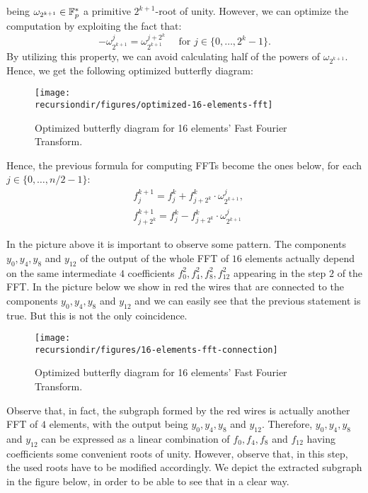 being $\omega_{2^{k+1}} \in \mathbb{F}_p^*$ a primitive $2^{k+1}$-root of unity. However, we can optimize the computation by exploiting the fact that:
\[
- \omega_{2^{k+1}}^j = \omega_{2^{k+1}}^{j + 2^k} \quad \text{ for } j \in \{0, \dots, 2^k - 1\}.
\]
By utilizing this property, we can avoid calculating half of the powers of $\omega_{2^{k+1}}$. Hence, we get the following optimized butterfly diagram:

\begin{figure}[H]
\centering
\texttt{[image: \\recursiondir/figures/optimized-16-elements-fft]}
\caption{Optimized butterfly diagram for 16 elements' Fast Fourier Transform.}
\label{fig:c12a-proof}
\end{figure}

Hence, the previous formula for computing FFTs become the ones below, for each $j \in \{0, \dots, n/2 - 1\}$:
\begin{align*}
&f_j^{k+1} = f_j^k + f_{j + 2^k}^{k} \cdot \omega_{2^{k+1}}^j,                                           \\
&f_{j + 2^k}^{k+1} = f_j^k - f_{j + 2^k}^{k} \cdot \omega_{2^{k+1}}^j
\end{align*}

In the picture above it is important to observe some pattern. The components $y_0, y_4, y_8$ and $y_{12}$ of the output of the whole FFT of $16$ elements actually depend on the same intermediate $4$ coefficients $f_0^2, f_4^2, f_8^2, f_{12}^2$ appearing in the step $2$ of the FFT. In the picture below we show in red the wires that are connected to the components $y_0, y_4, y_8$ and $y_{12}$ and we can easily see that the previous statement is true. But this is not the only coincidence. 

\begin{figure}[H]
\centering
\texttt{[image: \\recursiondir/figures/16-elements-fft-connection]}
\caption{Optimized butterfly diagram for 16 elements' Fast Fourier Transform.}
\label{fig:c12a-proof}
\end{figure}

Observe that, in fact, the subgraph formed by the red wires is actually another FFT of $4$ elements, with the output being $y_0, y_4, y_8$ and $y_{12}$. Therefore, $y_0, y_4, y_8$ and $y_{12}$ can be expressed as a linear combination of $f_0, f_4, f_8$ and $f_{12}$ having coefficients some convenient roots of unity. However, observe that, in this step, the used roots have to be modified accordingly. We depict the extracted subgraph in the figure below, in order to be able to see that in a clear way. 

